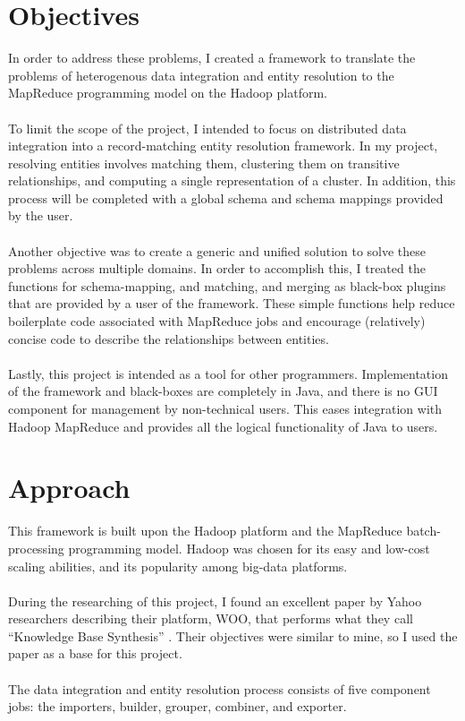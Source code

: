 \documentclass[12pt]{article}
\begin{document}
\section{Objectives}
In order to address these problems, I created a framework to translate the problems of heterogenous data integration and entity resolution to the MapReduce programming model on the Hadoop platform. \\\\
To limit the scope of the project, I intended to focus on distributed data integration into a record-matching entity resolution framework. 
In my project, resolving entities involves matching them, clustering them on transitive relationships, and computing a single representation of a cluster. 
In addition, this process will be completed with a global schema and schema mappings provided by the user.\\\\
Another objective was to create a generic and unified solution to solve these problems across multiple domains.
In order to accomplish this, I treated the functions for schema-mapping, and matching, and merging as black-box plugins that are provided by a user of the framework. These simple functions help reduce boilerplate code associated with MapReduce jobs and encourage (relatively) concise code to describe the relationships between entities.\\\\
Lastly, this project is intended as a tool for other programmers. 
Implementation of the framework and black-boxes are completely in Java, and there is no GUI component for management by non-technical users. 
This eases integration with Hadoop MapReduce and provides all the logical functionality of Java to users. 

\section{Approach}
This framework is built upon the Hadoop platform and the MapReduce batch-processing programming model. 
Hadoop was chosen for its easy and low-cost scaling abilities, and its popularity among big-data platforms.\\\\
During the researching of this project, I found an excellent paper by Yahoo researchers describing their platform, WOO, that performs what they call ``Knowledge Base Synthesis'' \cite{WOO}.
Their objectives were similar to mine, so I used the paper as a base for this project.\\\\
The data integration and entity resolution process consists of five component jobs: the importers, builder, grouper, combiner, and exporter.
\end{document}
